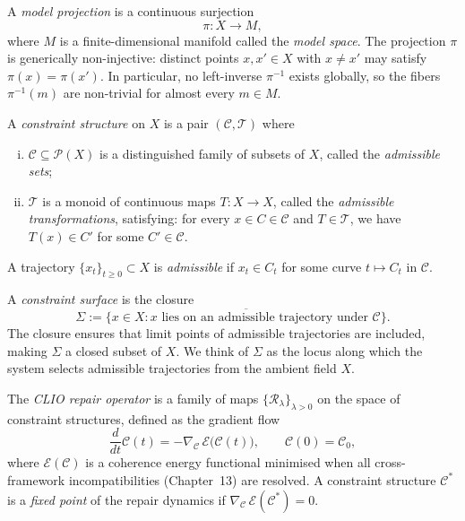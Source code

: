\documentclass[11pt,openany]{book}
\begin{document}
\begin{definition}
A \emph{model projection} is a continuous surjection
\[
  \pi : X \to M,
\]
where $M$ is a finite-dimensional manifold called the
\emph{model space}.  The projection $\pi$ is generically
non-injective: distinct points $x, x' \in X$ with $x \neq x'$
may satisfy $\pi(x) = \pi(x')$.  In particular, no
left-inverse $\pi^{-1}$ exists globally, so the fibers
$\pi^{-1}(m)$ are non-trivial for almost every $m \in M$.
\end{definition}

\begin{definition}
\label{def:constraint-structure}
A \emph{constraint structure} on $X$ is a pair
$(\mathcal{C}, \mathcal{T})$ where
\begin{enumerate}[(i)]
  \item $\mathcal{C} \subseteq \mathcal{P}(X)$ is a
    distinguished family of subsets of $X$, called the
    \emph{admissible sets};
  \item $\mathcal{T}$ is a monoid of continuous maps
    $T : X \to X$, called the \emph{admissible transformations},
    satisfying: for every $x \in C \in \mathcal{C}$ and
    $T \in \mathcal{T}$, we have $T(x) \in C'$ for some
    $C' \in \mathcal{C}$.
\end{enumerate}
A trajectory $\{x_t\}_{t \ge 0} \subset X$ is
\emph{admissible} if $x_t \in C_t$ for some curve
$t \mapsto C_t$ in $\mathcal{C}$.
\end{definition}

\begin{definition}
\label{def:constraint-surface}
A \emph{constraint surface} is the closure
\[
  \Sigma := \overline{\bigl\{x \in X : x \text{ lies on an
    admissible trajectory under } \mathcal{C}\bigr\}}.
\]
The closure ensures that limit points of admissible
trajectories are included, making $\Sigma$ a closed subset
of $X$.  We think of $\Sigma$ as the locus along which the
system selects admissible trajectories from the ambient
field $X$.
\end{definition}

\begin{definition}
\label{def:clio}
The \emph{CLIO repair operator} is a family of maps
$\{\mathcal{R}_\lambda\}_{\lambda > 0}$ on the space of
constraint structures, defined as the gradient flow
\[
  \frac{d}{dt}\mathcal{C}(t)
    = -\nabla_{\mathcal{C}} \,\mathcal{E}\bigl(\mathcal{C}(t)\bigr),
  \qquad \mathcal{C}(0) = \mathcal{C}_0,
\]
where $\mathcal{E}(\mathcal{C})$ is a coherence energy
functional minimised when all cross-framework
incompatibilities (Chapter~13) are resolved.  A constraint
structure $\mathcal{C}^*$ is a \emph{fixed point} of the
repair dynamics if $\nabla_{\mathcal{C}}\,
\mathcal{E}(\mathcal{C}^*) = 0$.
\end{definition}
\end{document}
